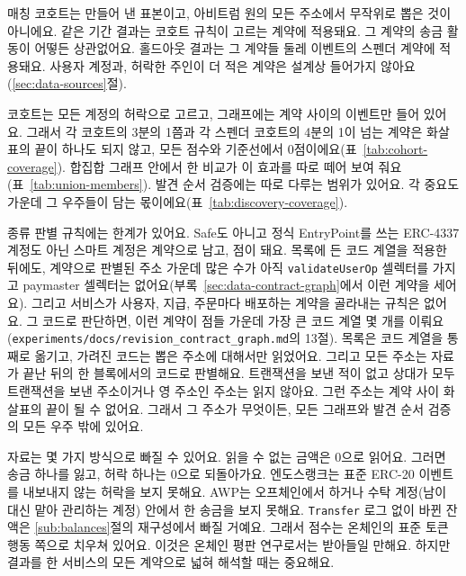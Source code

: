 
매칭 코호트는 만들어 낸 표본이고, 아비트럼 원의 모든 주소에서 무작위로 뽑은 것이 아니에요. 같은 기간 결과는 코호트 규칙이 고르는 계약에 적용돼요. 그 계약의 송금 활동이 어떻든 상관없어요. 홀드아웃 결과는 그 계약들 둘레 이벤트의 스펜더 계약에 적용돼요. 사용자 계정과, 허락한 주인이 더 적은 계약은 설계상 들어가지 않아요(\ref{sec:data-sources}절).

코호트는 모든 계정의 허락으로 고르고, 그래프에는 계약 사이의 이벤트만 들어 있어요. 그래서 각 코호트의 3분의 1쯤과 각 스펜더 코호트의 4분의 1이 넘는 계약은 화살표의 끝이 하나도 되지 않고, 모든 점수와 기준선에서 0점이에요(표~\ref{tab:cohort-coverage}). 합집합 그래프 안에서 한 비교가 이 효과를 따로 떼어 보여 줘요(표~\ref{tab:union-members}). 발견 순서 검증에는 따로 다루는 범위가 있어요. 각 중요도 가운데 그 우주들이 담는 몫이에요(표~\ref{tab:discovery-coverage}).

종류 판별 규칙에는 한계가 있어요. Safe도 아니고 정식 EntryPoint를 쓰는 ERC-4337 계정도 아닌 스마트 계정은 계약으로 남고, 점이 돼요. 목록에 든 코드 계열을 적용한 뒤에도, 계약으로 판별된 주소 가운데 많은 수가 아직 \texttt{validateUserOp} 셀렉터를 가지고 paymaster 셀렉터는 없어요(부록~\ref{sec:data-contract-graph}에서 이런 계약을 세어요). 그리고 서비스가 사용자, 지급, 주문마다 배포하는 계약을 골라내는 규칙은 없어요. 그 코드로 판단하면, 이런 계약이 점들 가운데 가장 큰 코드 계열 몇 개를 이뤄요(\texttt{experiments/docs/revision\_contract\_graph.md}의 13절). 목록은 코드 계열을 통째로 옮기고, 가려진 코드는 뽑은 주소에 대해서만 읽었어요. 그리고 모든 주소는 자료가 끝난 뒤의 한 블록에서의 코드로 판별해요. 트랜잭션을 보낸 적이 없고 상대가 모두 트랜잭션을 보낸 주소이거나 영 주소인 주소는 읽지 않아요. 그런 주소는 계약 사이 화살표의 끝이 될 수 없어요. 그래서 그 주소가 무엇이든, 모든 그래프와 발견 순서 검증의 모든 우주 밖에 있어요.

자료는 몇 가지 방식으로 빠질 수 있어요. 읽을 수 없는 금액은 0으로 읽어요. 그러면 송금 하나를 잃고, 허락 하나는 0으로 되돌아가요. 엔도스랭크는 표준 ERC-20 이벤트를 내보내지 않는 허락을 보지 못해요. AWP는 오프체인에서 하거나 수탁 계정(남이 대신 맡아 관리하는 계정) 안에서 한 송금을 보지 못해요. \texttt{Transfer} 로그 없이 바뀐 잔액은 \ref{sub:balances}절의 재구성에서 빠질 거예요. 그래서 점수는 온체인의 표준 토큰 행동 쪽으로 치우쳐 있어요. 이것은 온체인 평판 연구로서는 받아들일 만해요. 하지만 결과를 한 서비스의 모든 계약으로 넓혀 해석할 때는 중요해요.


